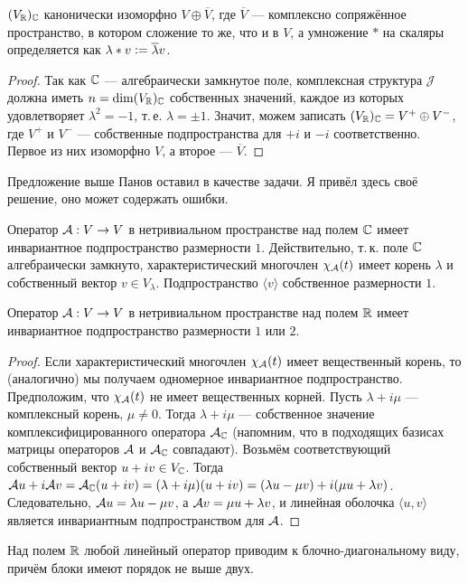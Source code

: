 \begin{proposal}
    $(V_{\mathbb{R}})_{\mathbb{C}}$ канонически изоморфно $V \oplus \overline{V}$, где $\overline{V}$ --- комплексно сопряжённое пространство, в котором сложение то же, что и в $V$, а умножение $\ast$ на скаляры определяется как $\lambda \ast v \vcentcolon = \overline{\lambda}v$.
\end{proposal}

\begin{proof}
    Так как $\mathbb{C}$ --- алгебраически замкнутое поле, комплексная структура $\mathcal{J}$ должна иметь $n = \dim (V_{\mathbb{R}})_{\mathbb{C}}$ собственных значений, каждое из которых удовлетворяет $\lambda^2 = -1$, т.\,е. $\lambda = \pm 1$. Значит, можем записать $(V_{\mathbb{R}})_{\mathbb{C}} = V^+ \oplus V^-$, где $V^+$ и $V^-$ --- собственные подпространства для $+i$ и $-i$ соответственно. Первое из них изоморфно $V$, а второе --- $\overline{V}$.
\end{proof}

\begin{remark}
    Предложение выше Панов оставил в качестве задачи. Я привёл здесь своё решение, оно может содержать ошибки.
\end{remark}

Оператор $\mathcal{A}: V \to V$ в нетривиальном пространстве над полем $\mathbb{C}$ имеет инвариантное подпространство размерности $1$. Действительно, т.\,к. поле $\mathbb{C}$ алгебраически замкнуто, характеристический многочлен $\chi_{\mathcal{A}}(t)$ имеет корень $\lambda$ и собственный вектор $v \in V_\lambda$. Подпространство $\langle v\rangle$ собственное размерности $1$.

\begin{theorem}
    Оператор $\mathcal{A}: V \to V$ в нетривиальном пространстве над полем $\mathbb{R}$ имеет инвариантное подпространство размерности $1$ или $2$.
\end{theorem}

\begin{proof}
    Если характеристический многочлен $\chi_{\mathcal{A}}(t)$ имеет вещественный корень, то (аналогично) мы получаем одномерное инвариантное подпространство. Предположим, что $\chi_{\mathcal{A}}(t)$ не имеет вещественных корней. Пусть $\lambda + i\mu$ --- комплексный корень, $\mu \ne 0$. Тогда $\lambda + i\mu$ --- собственное значение комплексифицированного оператора $\mathcal{A}_{\mathbb{C}}$ (напомним, что в подходящих базисах матрицы операторов $\mathcal{A}$ и $\mathcal{A}_{\mathbb{C}}$ совпадают). Возьмём соответствующий собственный вектор $u + iv \in V_{\mathbb{C}}$. Тогда $\mathcal{A} u + i\mathcal{A} v = \mathcal{A}_{\mathbb{C}}(u + iv) = (\lambda + i\mu)(u + iv) = (\lambda u - \mu v) + i(\mu u + \lambda v)$. Следовательно, $\mathcal{A} u = \lambda u - \mu v$, а $\mathcal{A} v = \mu u + \lambda v$, и линейная оболочка $\langle u, v\rangle$ является инвариантным подпространством для $\mathcal{A}$.
\end{proof}

\begin{corollary}
    Над полем $\mathbb{R}$ любой линейный оператор приводим к блочно-диагональному виду, причём блоки имеют порядок не выше двух.
\end{corollary}

